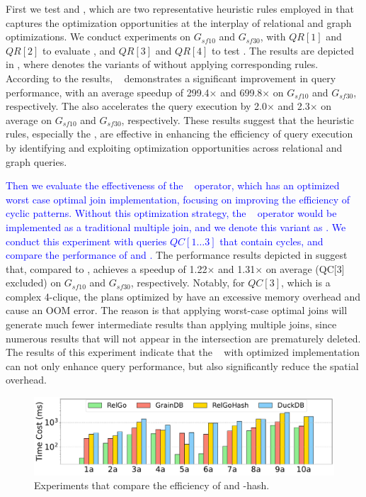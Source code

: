 First we test \filterrule and \joinfuserule, which are two representative heuristic rules employed in \name that captures the optimization opportunities at the interplay of relational and graph optimizations.
We conduct experiments on $G_{sf10}$ and $G_{sf30}$, with $QR[1]$ and $QR[2]$ to evaluate \filterrule, and $QR[3]$ and $QR[4]$ to test \joinfuserule.
The results are depicted in , where \relgonofi denotes the variants of \name without applying corresponding rules.
According to the results, \filterrule~ demonstrates a significant improvement in query performance, with an average speedup of 299.4$\times$ and 699.8$\times$ on $G_{sf10}$ and $G_{sf30}$, respectively.
The \joinfuserule also accelerates the query execution by 2.0$\times$ and 2.3$\times$ on average on $G_{sf10}$ and $G_{sf30}$, respectively.
These results suggest that the heuristic rules, especially the \filterrule, are effective in enhancing the efficiency of query execution by identifying and exploiting optimization opportunities across relational and graph queries.

\textcolor{blue}{
Then we evaluate the effectiveness of the \intersect~ operator, which has an optimized worst case optimal join implementation, focusing on improving the efficiency of cyclic patterns.
Without this optimization strategy, the \intersect~ operator would be implemented as a traditional multiple join, and we denote this variant as \relgomj.
We conduct this experiment with queries $QC[1\ldots 3]$ that contain cycles, and compare the performance of \name and \relgomj.
}
The performance results depicted in  suggest that, compared to \relgomj, \name achieves a speedup of 1.22$\times$ and 1.31$\times$ on average (QC[3] excluded) on $G_{sf10}$ and $G_{sf30}$, respectively.
Notably, for $QC[3]$, which is a complex 4-clique, the plans optimized by \relgomj have an excessive memory overhead and cause an OOM error.
The reason is that applying worst-case optimal joins will generate much fewer intermediate results than applying multiple joins, since numerous results that will not appear in the intersection are prematurely deleted.
The results of this experiment indicate that the \intersect~ with optimized implementation can not only enhance query performance, but also significantly reduce the spatial overhead.

\begin{figure}[ht]
    \centering
    \includegraphics[width=\linewidth]{./figures/exp/hash_plan_job.pdf}
    \caption{Experiments that compare the efficiency of \name and \name-hash.}
    \label{fig:exp-hash-plan}
\end{figure}

